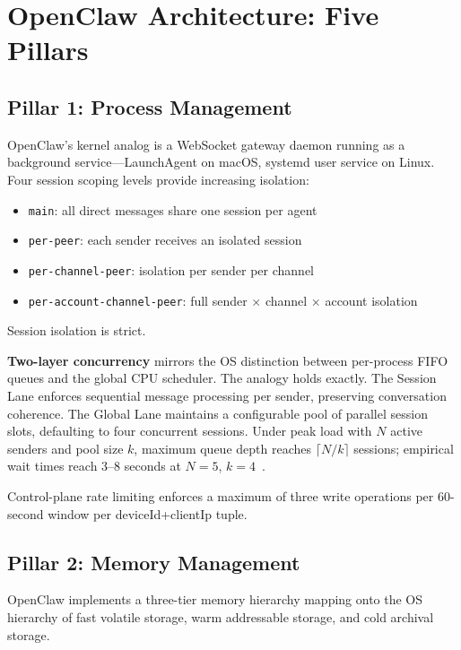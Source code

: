 \documentclass[journal]{IEEEtran}
\begin{document}
\section{OpenClaw Architecture: Five Pillars}

\subsection{Pillar 1: Process Management}

OpenClaw's kernel analog is a WebSocket gateway daemon running as a background
service---LaunchAgent on macOS, systemd user service on Linux. Four session
scoping levels provide increasing isolation:
\begin{itemize}
  \item \texttt{main}: all direct messages share one session per agent
  \item \texttt{per-peer}: each sender receives an isolated session
  \item \texttt{per-channel-peer}: isolation per sender per channel
  \item \texttt{per-account-channel-peer}: full sender $\times$ channel $\times$
  account isolation
\end{itemize}
Session isolation is strict.

\textbf{Two-layer concurrency} mirrors the OS distinction between per-process
FIFO queues and the global CPU scheduler. The analogy holds exactly. The Session Lane enforces sequential
message processing per sender, preserving conversation coherence. The Global
Lane maintains a configurable pool of parallel session slots, defaulting to
four concurrent sessions. Under peak load with $N$ active senders and pool
size $k$, maximum queue depth reaches $\lceil N/k \rceil$ sessions; empirical
wait times reach 3--8 seconds at $N=5$, $k=4$~\cite{openclaw2024github}.

Control-plane rate limiting enforces a maximum of three write operations per
60-second window per deviceId+clientIp tuple.

\subsection{Pillar 2: Memory Management}

OpenClaw implements a three-tier memory hierarchy mapping onto the OS hierarchy
of fast volatile storage, warm addressable storage, and cold archival storage.
\end{document}
